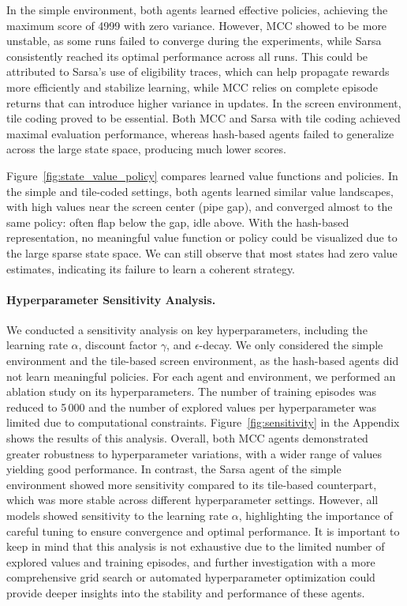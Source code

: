 \documentclass[runningheads]{llncs}
\begin{document}
In the simple environment, both agents learned effective policies, achieving the maximum score of 4999 with zero variance. However, MCC showed to be more unstable, as some runs failed to converge during the experiments, while Sarsa consistently reached its optimal performance across all runs. This could be attributed to Sarsa's use of eligibility traces, which can help propagate rewards more efficiently and stabilize learning, while MCC relies on complete episode returns that can introduce higher variance in updates. In the screen environment, tile coding proved to be essential. Both MCC and Sarsa with tile coding achieved maximal evaluation performance, whereas hash-based agents failed to generalize across the large state space, producing much lower scores. 

Figure~\ref{fig:state_value_policy} compares learned value functions and policies. In the simple and tile-coded settings, both agents learned similar value landscapes, with high values near the screen center (pipe gap), and converged almost to the same policy: often flap below the gap, idle above. With the hash-based representation, no meaningful value function or policy could be visualized due to the large sparse state space. We can still observe that most states had zero value estimates, indicating its failure to learn a coherent strategy.

\paragraph{Hyperparameter Sensitivity Analysis.} We conducted a sensitivity analysis on key hyperparameters, including the learning rate $\alpha$, discount factor $\gamma$, and $\epsilon$-decay. We only considered the simple environment and the tile-based screen environment, as the hash-based agents did not learn meaningful policies. For each agent and environment, we performed an ablation study on its hyperparameters. The number of training episodes was reduced to 5\,000 and the number of explored values per hyperparameter was limited due to computational constraints. Figure~\ref{fig:sensitivity} in the Appendix shows the results of this analysis. Overall, both MCC agents demonstrated greater robustness to hyperparameter variations, with a wider range of values yielding good performance. In contrast, the Sarsa agent of the simple environment showed more sensitivity compared to its tile-based counterpart, which was more stable across different hyperparameter settings. However, all models showed sensitivity to the learning rate $\alpha$, highlighting the importance of careful tuning to ensure convergence and optimal performance. It is important to keep in mind that this analysis is not exhaustive due to the limited number of explored values and training episodes, and further investigation with a more comprehensive grid search or automated hyperparameter optimization could provide deeper insights into the stability and performance of these agents.
\end{document}
